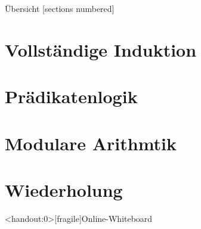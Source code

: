 %
%
%
%



\renewcommand\daynr{3}




\maketitle

\begin{frame}[fragile]{Übersicht}
	[sections numbered]
	\tableofcontents%
\end{frame}

\section{Vollständige Induktion}







\section{Prädikatenlogik}



\section{Modulare Arithmtik}


\section{Wiederholung}








\appendix

\begin{frame}<handout:0>[fragile]{Online-Whiteboard}
	\phantom{text}
\end{frame}


